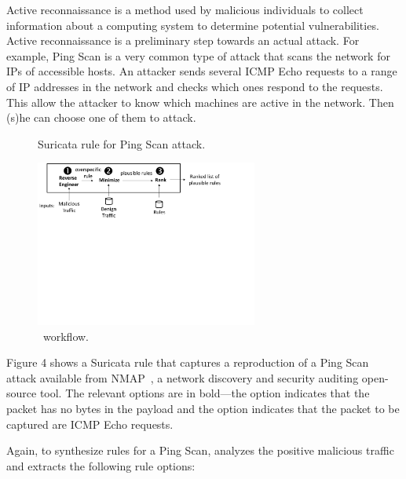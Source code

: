 \documentclass[sigconf,review, anonymous]{acmart}
\begin{document}
Active reconnaissance is a method used by malicious individuals to
collect information about a computing system to determine potential
vulnerabilities. Active reconnaissance is a preliminary step towards
an actual attack. For example, Ping Scan is a very common type of
attack that scans the network for IPs of accessible hosts. An attacker
sends several ICMP Echo requests to a range of IP addresses in the
network and checks which ones respond to the requests. This allow the
attacker to know which machines are active in the network. Then (s)he
can choose one of them to attack.

\begin{figure}[h!]
  \vspace{1ex}
  
  \caption{Suricata rule for Ping Scan attack.}
  \label{fig:pingscan-example}
  \vspace{1ex}  
\end{figure}

\begin{figure}[ht!]
  \centering
  \includegraphics[trim=0 350 100 0,clip,width=0.65\textwidth]{figs/nids-workflow}
  \caption{\tname\ workflow.}
  \label{fig:overview}
  \vspace{-1ex}
\end{figure}


Figure 4 shows a Suricata rule that captures a reproduction of a Ping
Scan attack available from NMAP~\cite{netmap}, a network discovery and
security auditing open-source tool. The relevant options are in
bold---the option  indicates that the packet has no
bytes in the payload and the option  indicates that
the packet to be captured are ICMP Echo requests.

Again, to synthesize rules for a Ping Scan, \tname{} analyzes the
positive malicious traffic and extracts the following rule options:
\end{document}
